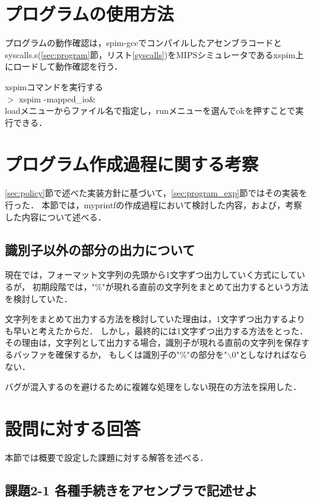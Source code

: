 \documentclass[11pt]{jarticle}
\begin{document}
\section{プログラムの使用方法}

プログラムの動作確認は，spim-gccでコンパイルしたアセンブラコードと
syscalls.s(\ref{sec:program}節，リスト\ref{syscalls})をMIPSシミュレータであるxspim上にロードして動作確認を行う．

xspimコマンドを実行する\\
$>$ xspim -mapped\_io\&\\

loadメニューからファイル名で指定し，runメニューを選んでokを押すことで実行できる．

\section{プログラム作成過程に関する考察}

\ref{sec:policy}節で述べた実装方針に基づいて，\ref{sec:program_exp}節ではその実装を行った．
本節では，myprintfの作成過程において検討した内容，および，考察した内容について述べる．

\subsection{識別子以外の部分の出力について}

現在では，フォーマット文字列の先頭から1文字ずつ出力していく方式にしているが，
初期段階では，"\%"が現れる直前の文字列をまとめて出力するという方法を検討していた．

文字列をまとめて出力する方法を検討していた理由は，1文字ずつ出力するよりも早いと考えたからだ．
しかし，最終的には1文字ずつ出力する方法をとった．
その理由は，文字列として出力する場合，識別子が現れる直前の文字列を保存するバッファを確保するか，
もしくは識別子の"\%"の部分を"$\backslash$0"としなければならない．

バグが混入するのを避けるために複雑な処理をしない現在の方法を採用した．

\section{設問に対する回答}

本節では概要で設定した課題に対する解答を述べる．

\subsection{課題2-1 各種手続きをアセンブラで記述せよ}
\end{document}
